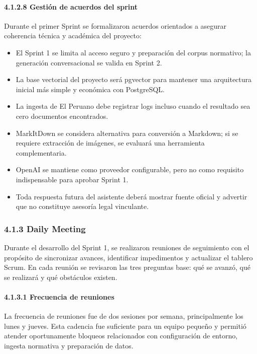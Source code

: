 \documentclass[12pt,a4paper,oneside]{report}
\begin{document}
\paragraph{4.1.2.8 Gestión de acuerdos del
sprint}\label{gestiuxf3n-de-acuerdos-del-sprint}

Durante el primer Sprint se formalizaron acuerdos orientados a asegurar
coherencia técnica y académica del proyecto:

\begin{itemize}
\item
  El Sprint 1 se limita al acceso seguro y preparación del corpus
  normativo; la generación conversacional se valida en Sprint 2.
\item
  La base vectorial del proyecto será pgvector para mantener una
  arquitectura inicial más simple y económica con PostgreSQL.
\item
  La ingesta de El Peruano debe registrar logs incluso cuando el
  resultado sea cero documentos encontrados.
\item
  MarkItDown se considera alternativa para conversión a Markdown; si se
  requiere extracción de imágenes, se evaluará una herramienta
  complementaria.
\item
  OpenAI se mantiene como proveedor configurable, pero no como requisito
  indispensable para aprobar Sprint 1.
\item
  Toda respuesta futura del asistente deberá mostrar fuente oficial y
  advertir que no constituye asesoría legal vinculante.
\end{itemize}

\subsubsection{4.1.3 Daily Meeting}\label{daily-meeting}

Durante el desarrollo del Sprint 1, se realizaron reuniones de
seguimiento con el propósito de sincronizar avances, identificar
impedimentos y actualizar el tablero Scrum. En cada reunión se revisaron
las tres preguntas base: qué se avanzó, qué se realizará y qué
obstáculos existen.

\paragraph{4.1.3.1 Frecuencia de
reuniones}\label{frecuencia-de-reuniones}

La frecuencia de reuniones fue de dos sesiones por semana,
principalmente los lunes y jueves. Esta cadencia fue suficiente para un
equipo pequeño y permitió atender oportunamente bloqueos relacionados
con configuración de entorno, ingesta normativa y preparación de datos.
\end{document}
